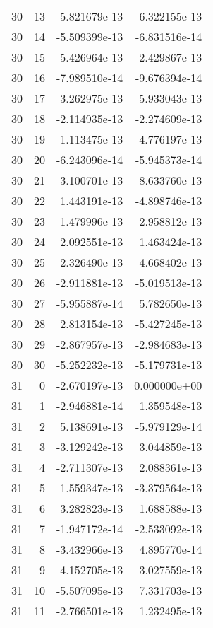 \begin{tabular}{rrrr}
  30 &   13 & -5.821679e-13 &  6.322155e-13 \\
  30 &   14 & -5.509399e-13 & -6.831516e-14 \\
  30 &   15 & -5.426964e-13 & -2.429867e-13 \\
  30 &   16 & -7.989510e-14 & -9.676394e-14 \\
  30 &   17 & -3.262975e-13 & -5.933043e-13 \\
  30 &   18 & -2.114935e-13 & -2.274609e-13 \\
  30 &   19 &  1.113475e-13 & -4.776197e-13 \\
  30 &   20 & -6.243096e-14 & -5.945373e-14 \\
  30 &   21 &  3.100701e-13 &  8.633760e-13 \\
  30 &   22 &  1.443191e-13 & -4.898746e-13 \\
  30 &   23 &  1.479996e-13 &  2.958812e-13 \\
  30 &   24 &  2.092551e-13 &  1.463424e-13 \\
  30 &   25 &  2.326490e-13 &  4.668402e-13 \\
  30 &   26 & -2.911881e-13 & -5.019513e-13 \\
  30 &   27 & -5.955887e-14 &  5.782650e-13 \\
  30 &   28 &  2.813154e-13 & -5.427245e-13 \\
  30 &   29 & -2.867957e-13 & -2.984683e-13 \\
  30 &   30 & -5.252232e-13 & -5.179731e-13 \\
  31 &    0 & -2.670197e-13 &  0.000000e+00 \\
  31 &    1 & -2.946881e-14 &  1.359548e-13 \\
  31 &    2 &  5.138691e-13 & -5.979129e-14 \\
  31 &    3 & -3.129242e-13 &  3.044859e-13 \\
  31 &    4 & -2.711307e-13 &  2.088361e-13 \\
  31 &    5 &  1.559347e-13 & -3.379564e-13 \\
  31 &    6 &  3.282823e-13 &  1.688588e-13 \\
  31 &    7 & -1.947172e-14 & -2.533092e-13 \\
  31 &    8 & -3.432966e-13 &  4.895770e-14 \\
  31 &    9 &  4.152705e-13 &  3.027559e-13 \\
  31 &   10 & -5.507095e-13 &  7.331703e-13 \\
  31 &   11 & -2.766501e-13 &  1.232495e-13 \\

\end{tabular}
